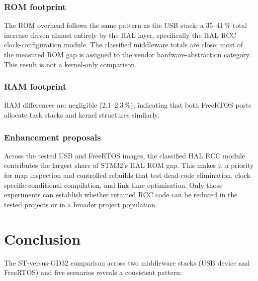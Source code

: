 \subsubsection*{ROM footprint}
The ROM overhead follows the same pattern as the USB stack: a 35--41\,\% total increase
driven almost entirely by the HAL layer, specifically the HAL RCC clock-configuration
module. The classified middleware totals are close; most of the measured ROM gap is assigned
to the vendor hardware-abstraction category. This result is not a kernel-only comparison.

\subsubsection*{RAM footprint}
RAM differences are negligible (2.1--2.3\,\%), indicating that both FreeRTOS ports allocate
task stacks and kernel structures similarly.

\subsubsection*{Enhancement proposals}
Across the tested USB and FreeRTOS images, the classified HAL RCC module contributes the
largest share of STM32's HAL ROM gap. This makes it a priority for map inspection and
controlled rebuilds that test dead-code elimination, clock-specific conditional compilation,
and link-time optimisation. Only those experiments can establish whether retained RCC code
can be reduced in the tested projects or in a broader project population.

\section*{Conclusion}

The ST-versus-GD32 comparison across two middleware stacks (USB device and FreeRTOS) and
five scenarios reveals a consistent pattern:


